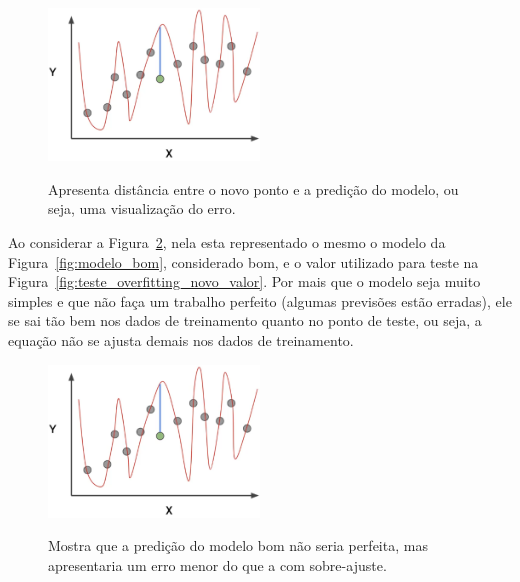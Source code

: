             \begin{figure}[H]
                \centering
                \caption{Apresenta distância entre o novo ponto e a predição do modelo, ou seja, uma visualização do erro.}
                \includegraphics[width=0.5\textwidth]{fig/2-fundamentacao/overfitting/overfitting_erro_evaluate.png}
                \label{fig:erro_novo_valor}
            \end{figure}
    
            Ao considerar a Figura~\ref{fig:teste_sem_overfitting}, nela esta representado o mesmo o modelo da Figura~\ref{fig:modelo_bom}, considerado bom, e o valor utilizado para teste na Figura~\ref{fig:teste_overfitting_novo_valor}. Por mais que o modelo seja muito simples e que não faça um trabalho perfeito (algumas previsões estão erradas), ele se sai tão bem nos dados de treinamento quanto no ponto de teste, ou seja, a equação não se ajusta demais nos dados de treinamento.
    
            \begin{figure}[H]
                \centering
                \caption{Mostra que a predição do modelo bom não seria perfeita, mas apresentaria um erro menor do que a com sobre-ajuste.}
                \includegraphics[width=0.5\textwidth]{fig/2-fundamentacao/overfitting/overfitting_erro_evaluate.png}
                \label{fig:teste_sem_overfitting}
            \end{figure}
            
